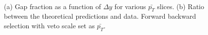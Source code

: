 \begin{figure}
\centering
\mbox{
              \quad
              \quad
}
\caption[Gap fraction as a function of $\Delta y$ for forward backward selection and variable $Q_0$]{ (a) Gap fraction as a function of $\Delta y$ for various $\bar{p_T}$ slices. (b) Ratio between the theoretical predictions and data. Forward backward selection with veto scale set as $\bar{p_T}$.
\label{GBJ1:pTSelB}}
\end{figure}

